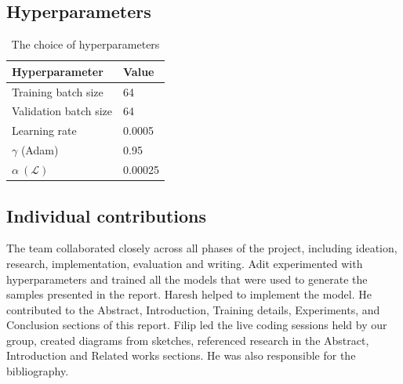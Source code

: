 \documentclass{article}
\begin{document}
\subsection{Hyperparameters}
\begin{table}[H]
  \caption{The choice of hyperparameters}
  \label{sample-table}
  \centering
  \begin{tabular}{ll}
    \toprule
    Hyperparameter     & Value\\
    \midrule
    Training batch size & 64\\
    Validation batch size & 64\\
    Learning rate & 0.0005\\
    $\gamma$ (Adam) & 0.95\\
    $\alpha\ (\mathcal{L})$ & 0.00025\\
    \bottomrule
  \end{tabular}
  \label{tab:hyperparams}
\end{table}
\subsection{Individual contributions}
The team collaborated closely across all phases of the project, including ideation, research, implementation, evaluation and writing. Adit experimented with hyperparameters and trained all the models that were used to generate the samples presented in the report. Haresh helped to implement the model. He contributed to the Abstract, Introduction, Training details, Experiments, and Conclusion sections of this report. Filip led the live coding sessions held by our group, created diagrams from sketches, referenced research in the Abstract, Introduction and Related works sections. He was also responsible for the bibliography.






\end{document}
